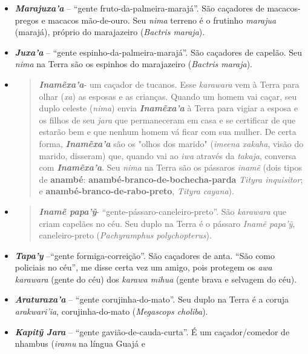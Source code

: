 \begin{itemize}
{  speciosa}).
\item
  \emph{\textbf{Marajuxa'a}} -- ``gente fruto-da-palmeira-marajá''. São
  caçadores de macacos-pregos e macacos mão-de-ouro. Seu \emph{nima}
  terreno é o frutinho \emph{marajua} (marajá), próprio do marajazeiro
  (\emph{Bactris maraja}).
\item
  \emph{\textbf{Juxa'a}} -- ``gente espinho-da-palmeira-marajá''. São
  caçadores de capelão. Seu \emph{nima} na Terra são os espinhos do
  marajazeiro (\emph{Bactris maraja}).
\item
  \begin{quote}
  \emph{\textbf{Inamẽxa'a}}- um caçador de tucanos. Esse \emph{karawara}
  vem à Terra para olhar (\emph{xa}) as esposas e as crianças. Quando um
  homem vai caçar, seu duplo celeste (\emph{nima}) envia
  \emph{\textbf{Inamẽxa'a}} à Terra para vigiar a esposa e os filhos de
  seu \emph{jara} que permaneceram em casa e se certificar de que
  estarão bem e que nenhum homem vá ficar com sua mulher. De certa
  forma, \emph{\textbf{Inamẽxa'a}} são os "olhos dos marido"
  (\emph{imeena xakaha}, visão do marido, disseram) que, quando vai ao
  \emph{iwa} através da \emph{takaja}, conversa com
  \emph{\textbf{Inamẽxa'a}}. Seu \emph{nima} na Terra são os pássaros
  \emph{inamẽ} (dois tipos de \textbf{anambé}:
  \textbf{anambé-branco-de-bochecha-parda} \emph{Tityra inquisitor}; e
  \textbf{anambé-branco-de-rabo-preto}, \emph{Tityra} \emph{cayana}).
  \end{quote}
\item
  \begin{quote}
  \emph{\textbf{Inamẽ papa'ỹ}}- ``gente-pássaro-caneleiro-preto''. São
  \emph{karawara} que criam capelães no céu. Seu duplo na Terra é o
  pássaro \emph{Inamẽ papa'ỹ}, caneleiro-preto (\emph{Pachyramphus
  polychopterus}).
  \end{quote}
\item
  \emph{\textbf{Tapa'y}} --``gente formiga-correição''. São caçadores de
  anta. ``São como policiais no céu'', me disse certa vez um amigo, pois
  protegem os \emph{awa} \emph{karawara} (gente do céu) dos \emph{karawa
  mihua} (gente brava e selvagem do céu).
\item
  \textbf{\emph{Araturaxa'a}} -- ``gente corujinha-do-mato''. Seu duplo
  na Terra é a coruja \emph{arakwari'ia}, corujinha-do-mato
  (\emph{Megascops choliba}).
\item
  \emph{\textbf{Kapitỹ Jara}} -- ``gente gavião-de-cauda-curta''. É um
  caçador/comedor de nhambus (\emph{iramu} na língua Guajá e

\end{itemize}
